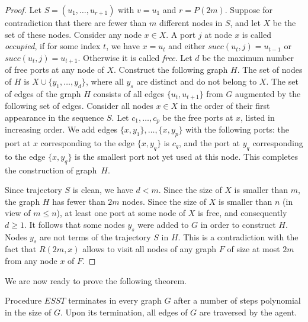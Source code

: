 \documentclass [11pt] {article}
\begin{document}
\begin{proof}
{Let $S=(u_1,\dots , u_{r+1})$ with $v=u_1$ and $r=P(2m)$.
Suppose for contradiction that there are fewer than $m$ different nodes in $S$, and let $X$ be the set of these nodes. Consider any node $x \in X$.
A port $j$ at node $x$ is called {\em occupied}, if for some index $t$, we have $x=u_t$ and either $succ(u_t,j)=u_{t-1}$ or   $succ(u_t,j)=u_{t+1}$.
Otherwise it is called {\em free}.
Let $d$ be the maximum number of free ports at any node of $X$.
Construct the following graph $H$. The set of nodes of $H$ is $X\cup\{y_1,\dots,y_d\}$, where all $y_s$ are distinct and do not belong to $X$. 
The set of edges of the graph $H$ consists of all edges $\{u_t,u_{t+1}\}$ from $G$ augmented by the following set of edges. Consider all nodes $x\in X$
in the order of their first appearance in the sequence $S$. Let $c_1,\dots,c_p$ be the free ports at $x$, listed in increasing order. We add edges $\{x,y_1\},\dots, \{x,y_p\}$ 
with the following ports: the port at $x$ corresponding to the edge  $\{x,y_q\}$ is $c_q$, and the port at $y_q$ corresponding to the edge  $\{x,y_q\}$ is the smallest port not yet used
at this node. This completes the construction of graph~$H$.}

{Since trajectory $S$ is clean, we have $d<m$. Since the size of $X$ is smaller than $m$, the graph $H$ has fewer than $2m$ nodes.
Since the size of $X$ is smaller than $n$ (in view of $m \leq n$), at least one port at some node of $X$ is free, and consequently $d\geq 1$.
It follows that some nodes $y_s$ were added to $G$ in order to construct $H$.
Nodes $y_s$ are not terms of the trajectory $S$ in $H$. This is a contradiction with the fact that $R(2m,x)$ allows to visit all nodes of any graph $F$ of size at most $2m$ from any node $x$ of $F$.}
\end{proof}

{We are now ready to prove the following theorem.}

\begin{theorem}
\label{theo:est}
{Procedure $ESST$ terminates in every graph $G$ after a number of steps polynomial in the size of $G$. Upon its termination, all {edges of $G$ are traversed 
by the agent}.}
\end{theorem}
\end{document}
